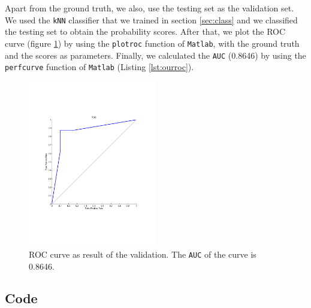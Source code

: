 \documentclass{article}
\begin{document}
Apart from the ground truth, we also, use the testing set as the validation set. We used the \texttt{kNN} classifier that we trained in section \ref{sec:class} and we classified the testing set to obtain the probability scores. After that, we plot the ROC curve (figure \ref{fig:roc}) by using the \texttt{plotroc} function of \texttt{Matlab}, with the ground truth and the scores as parameters. Finally, we calculated the \texttt{AUC} (0.8646) by using the \texttt{perfcurve} function of \texttt{Matlab} (Listing \ref{lst:ourroc}).

\begin{figure}
 \centering
 \includegraphics[trim=80 150 70 50 , clip, width=0.5\textwidth]{../figures/roc.pdf}
 \caption{ROC curve as result of the validation. The \texttt{AUC} of the curve is 0.8646.}
 \label{fig:roc}
\end{figure}


\FloatBarrier

\newpage

\begin{appendices}
\section{Code}




\end{appendices}
\end{document}
